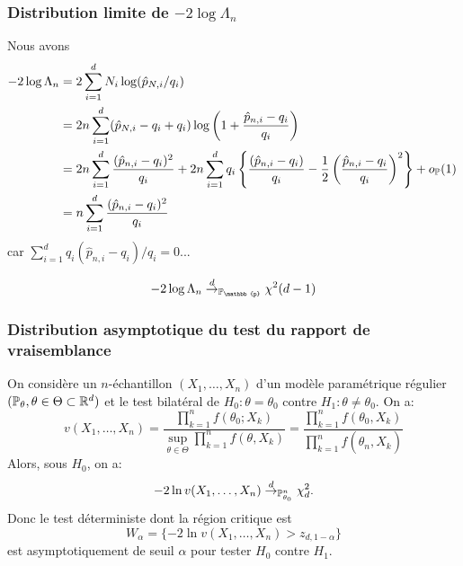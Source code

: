 \begin{frame}
\frametitle{Distribution limite de $-2 \log \Lambda_n$}
Nous avons
\begin{align*}
-2 \log \Lambda_n &= 2\sum_{i=1}^d N_i \log( \hat{p}_{N,i}/q_i) \\
                  &= 2 n \sum_{i=1}^d  (\hat{p}_{N,i} - q_i + q_i) \log\left( 1 + \frac{\hat{p}_{n,i}-q_i}{q_i} \right) \\
                  &= 2 n \sum_{i=1}^d \frac{(\hat{p}_{n,i}-q_i)^2}{q_i} + 2 n \sum_{i=1}^d q_i \left\{ \frac{(\hat{p}_{n,i}-q_i)}{q_i} - \frac{1}{2} \left(\frac{\hat{p}_{n,i}-q_i}{q_i} \right)^2 \right\} + o_{\operatorname{{\mathbb P}}}(1) \, \\
                  &= n \sum_{i=1}^d \frac{(\hat{p}_{n,i}-q_i)^2}{q_i}
\end{align*}
car $\sum_{i=1}^d q_i (\hat{p}_{n,i} - q_i)/q_i= 0$...

\alert{
\[
-2 \log \Lambda_n \dlim_{\PP_{\mathbb{p}}} \chi^2(d-1)
\]
}

\end{frame}



\begin{frame}
\frametitle{Distribution asymptotique du test du rapport de vraisemblance}
\begin{theo}
On considère un $n$-échantillon $(X_1,\dots,X_n)$ d'un modèle paramétrique régulier $(\operatorname{{\mathbb P}}_\theta, \theta \in \Theta \subset \mathbb{R}^d)$ et le test bilat\'{e}ral de $H_{0} :  \theta=\theta_{0}$  contre $H_{1} :  \theta\neq\theta_{0}$.  On a:
$$
v(X_1,\dots,X_n)=\frac{\prod_{k=1}^n f(\theta_{0};X_k)}{\sup_{\theta\in\Theta} \prod_{k=1}^n f(\theta,X_k)}=\frac{\prod_{k=1}^n f(\theta_0,X_k)}{\prod_{k=1}^n f(\hat{\theta}_{n},X_k)}
$$
 Alors, sous $H_{0}$, on a:
$$
-2\ln v(X_1,\dots,X_n)\stackrel{d}{\rightarrow}_{\operatorname{{\mathbb P}}_{\theta_0}^n} \chi_{d}^{2}.
$$
 Donc le test d\'{e}terministe dont la r\'{e}gion critique est
$$
W_\alpha=\{-2\ln v(X_1,\dots,X_n)>z_{d,1-\alpha}\}
$$
est asymptotiquement de seuil $\alpha$ pour tester $H_{0}$  contre $H_{1}$.
\end{theo}
\end{frame}

